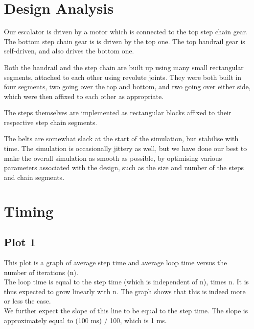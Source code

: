 \documentclass[11pt]{article}
\begin{document}
\section{Design Analysis}

	Our escalator is driven by a motor which is connected to the top step chain gear. The bottom step chain gear is is driven by the top one. The top handrail gear is self-driven, and also drives the bottom one.
	
	Both the handrail and the step chain are built up using many small rectangular segments, attached to each other using revolute joints. They were both built in four segments, two going over the top and bottom, and two going over either side, which were then affixed to each other as appropriate.
	
	The steps themselves are implemented as rectangular blocks affixed to their respective step chain segments.
	
	The belts are somewhat slack at the start of the simulation, but stabilise with time. The simulation is occasionally jittery as well, but we have done our best to make the overall simulation as smooth as possible, by optimising various parameters associated with the design, such as the size and number of the steps and chain segments.

\section{Timing}

\subsection{Plot 1}

	
	This plot is a graph of average step time and average loop time versus the number of iterations (n).\\

	The loop time is equal to the step time (which is independent of n), times n. It is thus expected to grow linearly with n. The graph shows that this is indeed more or less the case.\\

	We further expect the slope of this line to be equal to the step time. The slope is approximately equal to (100 ms) / 100, which is 1 ms.\\
\end{document}
